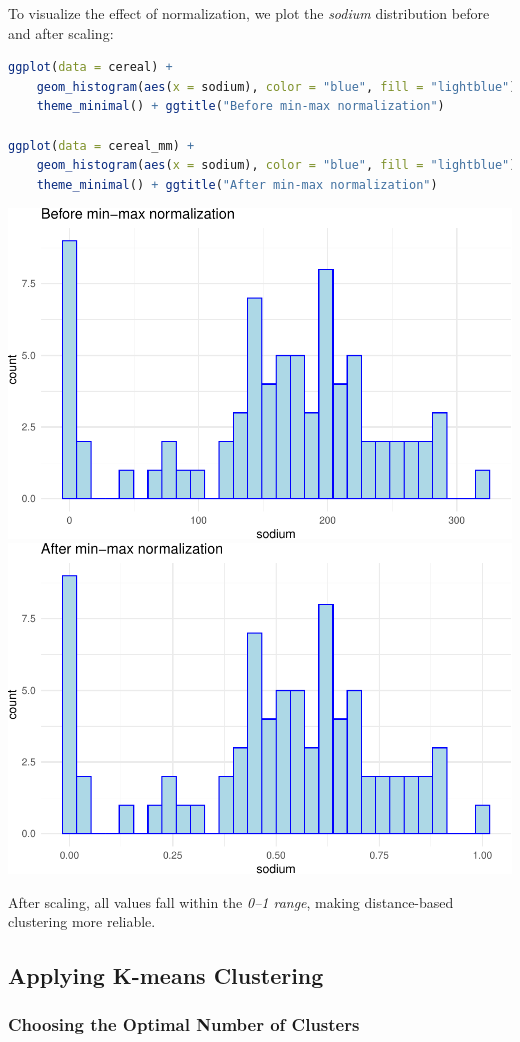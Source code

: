 \documentclass[
]{book}
\theoremstyle{definition}
\theoremstyle{definition}
\theoremstyle{definition}
\theoremstyle{definition}
\theoremstyle{remark}
\begin{document}
To visualize the effect of normalization, we plot the \emph{sodium} distribution before and after scaling:

\begin{lstlisting}[language=R]
ggplot(data = cereal) +
    geom_histogram(aes(x = sodium), color = "blue", fill = "lightblue") +
    theme_minimal() + ggtitle("Before min-max normalization")

ggplot(data = cereal_mm) +
    geom_histogram(aes(x = sodium), color = "blue", fill = "lightblue") + 
    theme_minimal() + ggtitle("After min-max normalization")
\end{lstlisting}

\includegraphics[width=0.5\linewidth]{clustering_files/figure-latex/unnamed-chunk-8-1} \includegraphics[width=0.5\linewidth]{clustering_files/figure-latex/unnamed-chunk-8-2}

After scaling, all values fall within the \emph{0--1 range}, making distance-based clustering more reliable.

\subsection{Applying K-means Clustering}\label{applying-k-means-clustering}

\subsubsection*{Choosing the Optimal Number of Clusters}\label{choosing-the-optimal-number-of-clusters}
\end{document}
